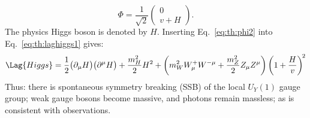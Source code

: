 \begin{equation}
  \Phi = \frac{1}{\sqrt{2}}
  \begin{pmatrix} 0 \\ v+H
  \end{pmatrix}.
  \label{eq:th:phi2}
\end{equation}
The physics Higgs boson is denoted by $H$.
Inserting Eq.~\ref{eq:th:phi2} into Eq.~\ref{eq:th:laghiggs1} gives:
\begin{equation}
  \Lag{Higgs} =
  \frac{1}{2}\big(\partial_\mu H\big)\big(\partial^\mu H\big)
  +\frac{m_H^2}{2}H^2
  +\left(m_W^2W_\mu^+W^{-\mu} + \frac{m_Z^2}{2}Z_\mu Z^\mu\right)
  \left(1 + \frac{H}{v}\right)^{\!2}
  \label{eq:th:laghiggs2}
\end{equation}
Thus: there is spontaneous symmetry breaking (SSB) of the local $U_Y(1)$ gauge group; weak gauge
bosons become massive, and photons remain massless; as is consistent with observations.

